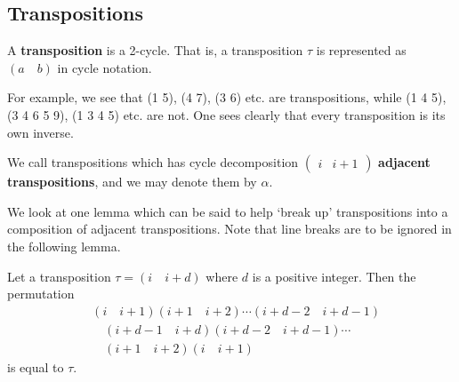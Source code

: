 \subsection{Transpositions}
\begin{definition}
    A \textbf{transposition} is a 2-cycle. That is, a transposition $\tau$ is represented as $(a\quad b)$ in cycle notation.
\end{definition}
For example, we see that (1 5), (4 7), (3 6) etc. are transpositions, while (1 4 5), (3 4 6 5 9), (1 3 4 5) etc. are not. One sees clearly that every transposition is its own inverse.

We call transpositions which has cycle decomposition $\begin{pmatrix}i&i+1\end{pmatrix}$ \textbf{adjacent transpositions}, and we may denote them by $\alpha$.

We look at one lemma which can be said to help `break up' transpositions into a composition of adjacent transpositions. Note that line breaks are to be ignored in the following lemma.
\begin{lemma}\label{lemma-decompose-transposition}
    Let a transposition $\tau = (i\quad i+d)$ where $d$ is a positive integer. Then the permutation
    \begin{align*}
        & (i\quad i+1)(i+1\quad i+2)\cdots(i+d-2\quad i+d-1)\\
        &\quad (i+d-1\quad i+d)(i+d-2\quad i+d-1)\cdots\\
        &\quad (i+1\quad i+2)(i\quad i+1)
    \end{align*}
    is equal to $\tau$.
\end{lemma}

